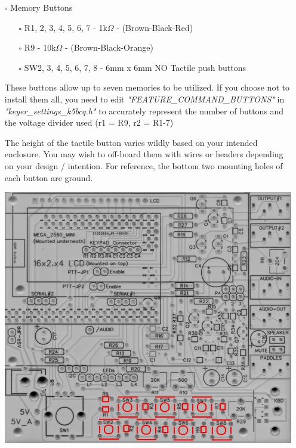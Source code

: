\documentclass[11pt]{article}
\begin{document}
\newpage
\begin{itemize}
\item[{$\square$}] Memory Buttons
\begin{itemize}
\item[{$\square$}] R1, 2, 3, 4, 5, 6, 7 - 1k\(\Omega\) - (Brown-Black-Red)
\item[{$\square$}] R9 - 10k\(\Omega\) - (Brown-Black-Orange)
\item[{$\square$}] SW2, 3, 4, 5, 6, 7, 8 - 6mm x 6mm NO Tactile push buttons
\end{itemize}
These buttons allow up to seven memories to be utilized.  If you choose not to install them all, you need to edit \emph{"FEATURE\_COMMAND\_BUTTONS"} in \emph{"keyer\_settings\_k5bcq.h"} to accurately represent the number of buttons and the voltage divider used (r1 = R9, r2 = R1-7)

 The height of the tactile button varies wildly based on your intended enclosure.  You may wish to off-board them with wires or headers depending on your design / intention.  For reference, the bottom two mounting holes of each button are ground.
\begin{center}
\includegraphics[width=.9\linewidth]{../png/3.2/pcb-top-memory-buttons.png}
\end{center}
\end{itemize}
\end{document}
